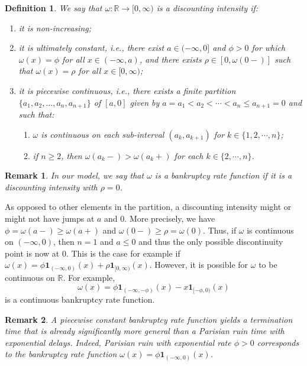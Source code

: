 \documentclass[10pt,a4paper]{amsart}
\newtheorem{remark}{Remark}[section]
\newtheorem{definition}{Definition}[section]
\newcommand{\reals}{\mathbb{R}}
\newcommand{\ind}{\mathbf{1}}
\renewcommand{\leq}{\leqslant}
\renewcommand{\geq}{\geqslant}
\begin{document}
\begin{definition}\label{def:bankruptcy-rate-function}
	We say that $\omega \colon \reals \to [0,\infty)$ is a discounting intensity if:
	\begin{enumerate}
		\item it is non-increasing;
		\item it is \textit{ultimately constant}, i.e., there exist $a \in (-\infty,0]$ and $\phi > 0$ for which $\omega(x)=\phi$ for all $x \in (-\infty,a)$, and there exists $\rho \in [0, \omega(0-)]$ such that $\omega(x)=\rho$ for all $x \in [0,\infty)$;
		\item it is piecewise continuous, i.e., there exists a finite partition $\{a_1, a_2, \dots, a_n, a_{n+1}\}$ of $[a,0]$ given by $a = a_1 < a_2 < \cdots < a_n \leq a_{n+1} = 0$ and such that:
		\begin{enumerate}
			\item $\omega$ is continuous on each sub-interval $(a_k,a_{k+1})$ for $k \in \lbrace 1,2,\cdots,n \rbrace$;
			\item if $n \geq 2$, then $\omega(a_k-)>\omega(a_k+)$ for each $k \in \lbrace 2,\cdots,n \rbrace$.
		\end{enumerate}
	\end{enumerate}
\end{definition}
\begin{remark}
	In our model, we say that $\omega$ is a bankruptcy rate function if it is a discounting intensity with $\rho=0$.
\end{remark}

As opposed to other elements in the partition, a discounting intensity might or might not have jumps at $a$ and $0$. More precisely, we have $\phi=\omega(a-) \geq \omega(a+)$ and $\omega(0-) \geq \rho=\omega(0)$. Thus, if $\omega$ is continuous on $(-\infty,0)$, then $n=1$ and $a \leq 0$ and thus the only possible discontinuity point is now at $0$. This is the case for example if $\omega(x) = \phi \ind_{(-\infty,0)} (x) + \rho \ind_{[0,\infty)}(x)$. However, it is possible for $\omega$ to be continuous on $\reals$. For example,
\[
\omega(x) = \phi \ind_{(-\infty,-\phi)}(x) - x \ind_{[-\phi,0)}(x)
\]
is a continuous bankruptcy rate function.%

\begin{remark}
A piecewise constant bankruptcy rate function yields a termination time that is already significantly more general than a Parisian ruin time with exponential delays. Indeed, Parisian ruin with exponential rate $\phi>0$ corresponds to the bankruptcy rate function $\omega(x) = \phi \ind_{(-\infty,0)}(x)$.
\end{remark}
\end{document}
